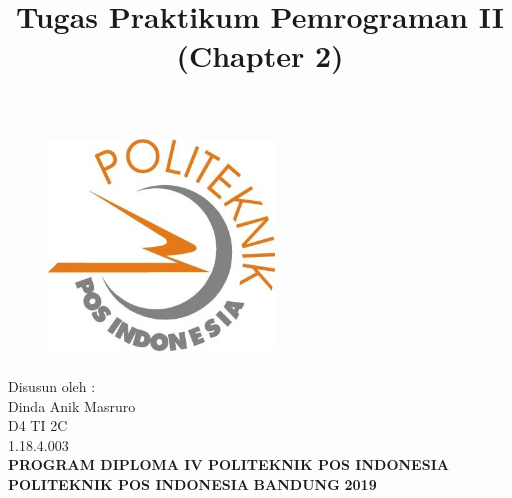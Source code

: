 \documentclass[a4paper, 12pt]{article}
\begin{document}
\title{\huge\textbf{Tugas Praktikum Pemrograman II (Chapter 2)}}
\date{}

\maketitle


\begin{figure}[!ht]
\begin{center}
\includegraphics[width = 6cm, height = 6cm]{gambar/poltekpos.jpg}
\end{center}
\end{figure}

\begin{center}
\vspace{1cm}
Disusun oleh :\\
Dinda Anik Masruro\\
D4 TI 2C\\
1.18.4.003\\
\vspace{1cm}
\textbf{PROGRAM DIPLOMA IV POLITEKNIK POS INDONESIA} \linebreak
\textbf{POLITEKNIK POS INDONESIA} \linebreak
\textbf{BANDUNG}\linebreak
\textbf{2019}

\end{center}


\thispagestyle{empty}


\end{document}
